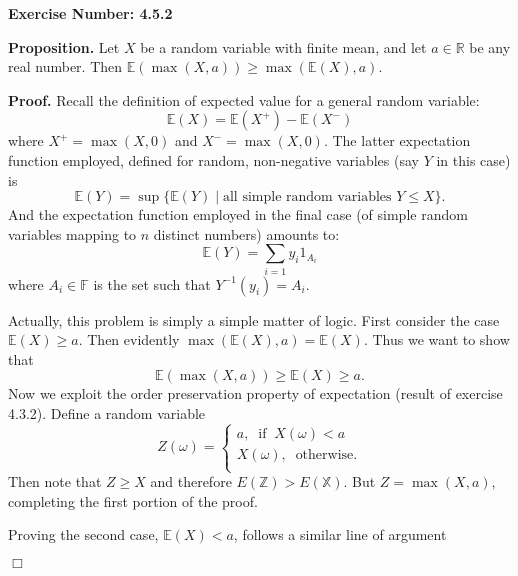 \documentclass{article}
\begin{document}
\noindent \textbf{Exercise Number: 4.5.2}  %

\medskip 

\noindent \textbf{Proposition.} Let $X$ be a random variable with finite mean, and let $a \in \mathbb{R}$ be any real number. Then $\mathbb{E}(\max(X,a)) \geq \max(\mathbb{E}(X), a)$. 

\bigskip

\noindent \textbf{Proof.} Recall the definition of expected value for a general random variable: \[\mathbb{E}(X) = \mathbb{E}(X^+) - \mathbb{E}(X^-)\] where $X^+ = \max(X,0)$ and $X^- = \max(X,0)$. The latter expectation function employed, defined for random, non-negative variables (say $Y$ in this case) is \[\mathbb{E}(Y) = \sup\{\mathbb{E}(Y) \mid \text{all simple random variables }  Y \leq X\}.\] And the expectation function employed in the final case (of simple random variables mapping to $n$ distinct numbers) amounts to: \[\mathbb{E}(Y) = \sum_{i = 1} y_i 1_{A_i} \] where $A_i \in \mathbb{F}$ is the set such that $Y^{-1}(y_i) = A_i$.

Actually, this problem is simply a simple matter of logic. First consider the case $\mathbb{E}(X) \geq a$. Then evidently $\max(\mathbb{E}(X), a) = \mathbb{E}(X)$. Thus we want to show that \[\mathbb{E}(\max(X,a)) \geq \mathbb{E}(X) \geq a.\] Now we exploit the order preservation property of expectation (result of exercise 4.3.2). Define a random variable \[Z(\omega) = \begin{cases} a, \;\; \text{if} \;\; X(\omega) < a \\ X(\omega), \; \;\text{otherwise}.\\ \end{cases}\] Then note that $Z \geq X$ and therefore $E(\mathbb{Z}) > E(\mathbb{X})$. But $Z = \max(X,a)$, completing the first
portion of the proof. 



Proving the second case, $\mathbb{E}(X) < a$, follows a similar line of argument 

\hfill $\Box$
\end{document}
